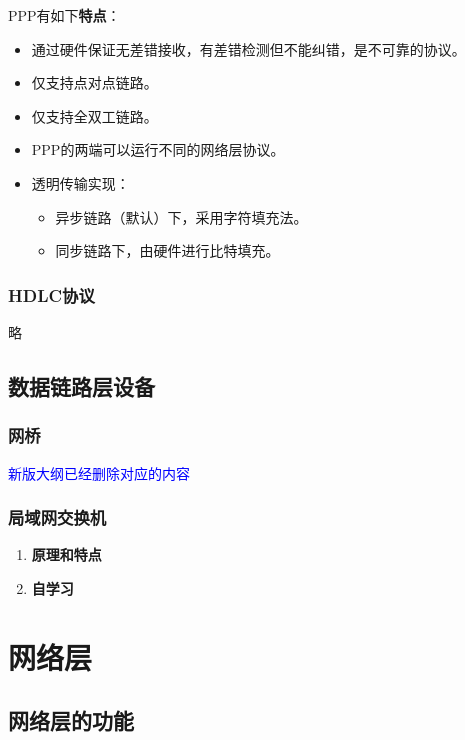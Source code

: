 \documentclass[12pt, a4paper, oneside]{ctexart}
\begin{document}
PPP有如下\textbf{特点}：
\begin{itemize}
    \item 通过硬件保证无差错接收，有差错检测但不能纠错，是不可靠的协议。
    \item 仅支持点对点链路。
    \item 仅支持全双工链路。
    \item PPP的两端可以运行不同的网络层协议。
    \item 透明传输实现：
    \begin{itemize}
        \item 异步链路（默认）下，采用字符填充法。
        \item 同步链路下，由硬件进行比特填充。
    \end{itemize}
\end{itemize}

\subsubsection{HDLC协议}

略

\subsection{数据链路层设备}

\subsubsection{网桥}

\textcolor{blue}{新版大纲已经删除对应的内容}

\subsubsection{局域网交换机}

\begin{enumerate}
    \item {\bf 原理和特点}
    \item {\bf 自学习}
\end{enumerate}

\section{网络层}

\subsection{网络层的功能}
\end{document}
